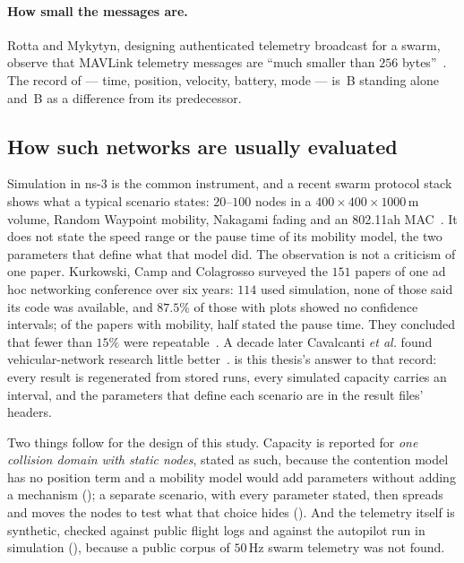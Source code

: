 \paragraph{How small the messages are.} Rotta and Mykytyn, designing authenticated telemetry
broadcast for a swarm, observe that MAVLink telemetry messages are ``much smaller than $256$
bytes''~\cite{rotta2024telemetrybroadcast}. The record of  --- time, position,
velocity, battery, mode --- is \keyLean\,B standing alone and \deltaLean\,B as a difference from
its predecessor.

\subsection{How such networks are usually evaluated}

Simulation in ns-3 is the common instrument, and a recent swarm protocol stack shows what a
typical scenario states: $20$--$100$ nodes in a $400 \times 400 \times 1000$\,m volume, Random
Waypoint mobility, Nakagami fading and an 802.11ah MAC~\cite{bhatt2025uavswarmmac}. It does not
state the speed range or the pause time of its mobility model, the two parameters that define
what that model did. The observation is not a criticism of one paper. Kurkowski, Camp and
Colagrosso surveyed the $151$ papers of one ad hoc networking conference over six years: $114$
used simulation, none of those said its code was available, and $87.5\%$ of those with plots
showed no confidence intervals; of the papers with mobility, half stated the pause time. They
concluded that fewer than $15\%$ were repeatable~\cite{kurkowski2005incredibles}. A decade
later Cavalcanti \emph{et al.} found vehicular-network research little
better~\cite{cavalcanti2018vanet}.  is this thesis's answer to that
record: every result is regenerated from stored runs, every simulated capacity carries an
interval, and the parameters that define each scenario are in the result files' headers.

Two things follow for the design of this study. Capacity is reported for \emph{one collision
domain with static nodes}, stated as such, because the contention model has no position term and
a mobility model would add parameters without adding a mechanism (); a
separate scenario, with every parameter stated, then spreads and moves the nodes to test what
that choice hides (). And
the telemetry itself is synthetic, checked against public flight logs and against the autopilot
run in simulation (), because a public corpus of $50$\,Hz swarm telemetry was not
found.

